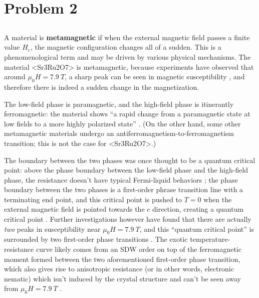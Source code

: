 \documentclass[hyperref, a4paper]{article}
\newcommand*{\concept}[1]{{\textbf{#1}}}
\def\ce#1{<#1>}%
\begin{document}
\subsection{}



\section{Problem 2}

\subsection{}

A material is \concept{metamagnetic} if 
when the external magnetic field passes a finite value $H_{\text{c}}$,
the magnetic configuration changes all of a sudden.
This is a phenomenological term 
and may be driven by various physical mechanisms.
The material \ce{Sr3Ru2O7} is metamagnetic, 
because experiments have observed that 
around $\mu_0 H = \SI{7.9}{T}$, 
a sharp peak can be seen in magnetic susceptibility
\cite{grigera2004disorder},
and therefore there is indeed a sudden change in the magnetization.

The low-field phase is paramagnetic, 
and the high-field phase is itinerantly ferromagnetic:
the material shows 
``a rapid change from a paramagnetic state at low fields to
a more highly polarized state'' \cite{perry2001metamagnetism}.
(On the other hand, some other metamagnetic materials 
undergo an antiferromagnetism-to-ferromagnetism transition;
this is not the case for \ce{Sr3Ru2O7}.)

The boundary between the two phases was once thought to be a quantum critical point:
above the phase boundary between the low-field phase and the high-field phase,
the resistance doesn't have typical Fermi-liquid behaviors
\cite{perry2001metamagnetism};
the phase boundary between the two phases 
is a first-order phrase transition line with a terminating end point, 
and this critical point is pushed to $T = 0$
when the external magnetic field is pointed towards the $c$ direction,
creating a quantum critical point \cite{grigera2003angular}.
Further investigations however have found 
that there are actually \emph{two} peaks in susceptibility 
near $\mu_0 H =\SI{7.9}{T}$, 
and this ``quantum critical point'' is surrounded by two first-order phase transitions
\cite{kitagawa2005metamagnetic,grigera2004disorder}.
The exotic temperature-resistance curve likely comes from 
an SDW order on top of the ferromagnetic moment
formed between the two aforementioned first-order phase transition,
which also gives rise to anisotropic resistance
(or in other words, electronic nematic)
which isn't induced by the crystal structure
and can't be seen away from $\mu_0 H =\SI{7.9}{T}$
\cite{lester2015field,borzi2007formation}.
\end{document}
